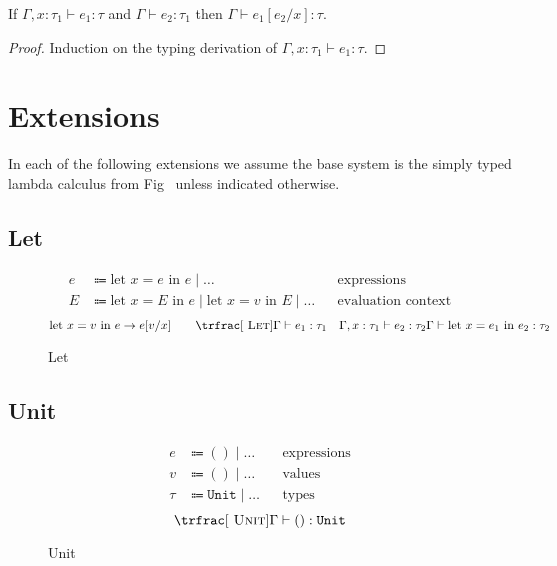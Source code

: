 \documentclass[nonacm]{acmart}
\newcommand{\unit}{\texttt{Unit}}
\begin{document}
\begin{lemma}
  If \(\Gamma, x : \tau_1 \vdash e_1 : \tau \) and \(\Gamma \vdash e_2 : \tau_1\)
  then \(\Gamma \vdash e_1[e_2/x] : \tau \).
\end{lemma}

\begin{proof}
  Induction on the typing derivation of \(\Gamma, x : \tau_1 \vdash e_1 : \tau \).
\end{proof}

\section{Extensions}

In each of the following extensions we assume the base system is the simply
typed lambda calculus from Fig~\cite{fig:stlc} unless indicated otherwise.

\subsection{Let}

\begin{figure}
  \begin{framed}
    \begin{align*}
      e & \Coloneqq \text{let } x = e \text{ in } e \mid \dots                                      &  & \text{expressions}        \\
      E & \Coloneqq \text{let } x = E \text{ in } e \mid \text{let } x = v \text{ in } E \mid \dots &  & \text{evaluation context}
    \end{align*}
    \[
      \text{let } x = v \text{ in } e \rightarrow e[v/x]
      \qquad
      \trfrac[~\textsc{Let}]{\Gamma \vdash e_1 : \tau_1 \quad \Gamma, x : \tau_1 \vdash e_2 : \tau_2}{\Gamma \vdash \text{let } x = e_1 \text{ in } e_2 : \tau_2}
    \]
  \end{framed}
  \caption{Let}\label{fig:let}
\end{figure}

\subsection{Unit}

\begin{figure}
  \begin{framed}
    \begin{align*}
      e    & \Coloneqq () \mid \dots    &  & \text{expressions} \\
      v    & \Coloneqq () \mid \dots    &  & \text{values}      \\
      \tau & \Coloneqq \unit \mid \dots &  & \text{types}
    \end{align*}
    \[
      \trfrac[~\textsc{Unit}]{}{\Gamma \vdash () : \unit}
    \]
  \end{framed}
  \caption{Unit}\label{fig:unit}
\end{figure}
\end{document}
